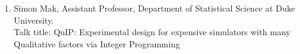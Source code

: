 \documentclass[12pt,a4paper,figuresright]{book}
\begin{document}
\begin{enumerate}
\item Simon Mak, Assistant Professor, Department of Statistical Science at Duke University. \\
Talk title: QuIP: Experimental design for expensive simulators with many Qualitative factors via Integer Programming



\end{enumerate}
\end{document}
